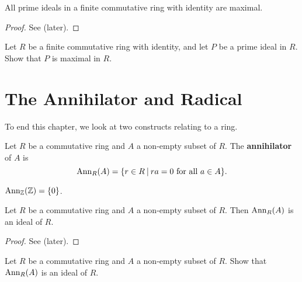 \begin{theorem}\label{thrm-prime-ideal-is-maximal-in-finite-commutative-ring-with-identity}
    All prime ideals in a finite commutative ring with identity are maximal.
\end{theorem}
\begin{proof}
    See  (later).
\end{proof}
\begin{exercise}\label{exercise-prime-ideal-is-maximal-in-finite-commutative-ring-with-identity}
    Let $R$ be a finite commutative ring with identity, and let $P$ be a prime ideal in $R$. Show that $P$ is maximal in $R$.
\end{exercise}

\newpage

\section{The Annihilator and Radical}
To end this chapter, we look at two constructs relating to a ring.
\begin{definition}
    Let $R$ be a commutative ring and $A$ a non-empty subset of $R$. The \textbf{annihilator} of $A$ is
    \[
        \Ann{R}{A} = \{r \in R \vert ra = 0 \text{ for all } a \in A\}.
    \]
\end{definition}
\begin{example}
    $\mathrm{Ann}_{\mathbb{Z}}(\mathbb{Z}) = \{0\}$.
\end{example}
\begin{proposition}
    Let $R$ be a commutative ring and $A$ a non-empty subset of $R$. Then $\mathrm{Ann}_{R}(A)$ is an ideal of $R$.
\end{proposition}
\begin{proof}
    See  (later).
\end{proof}
\begin{exercise}\label{exercise-annihilator-is-an-ideal}
    Let $R$ be a commutative ring and $A$ a non-empty subset of $R$. Show that $\mathrm{Ann}_{R}(A)$ is an ideal of $R$.
\end{exercise}

